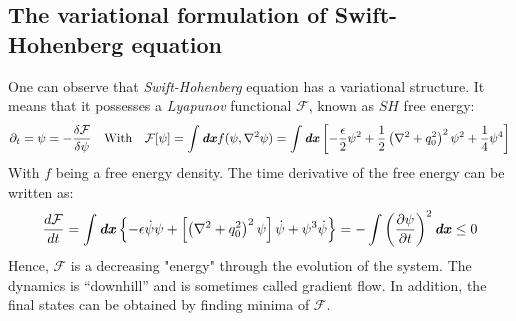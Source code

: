 \documentclass[11pt]{article}
\begin{document}
\subsection{The variational formulation of Swift-Hohenberg equation}
One can observe that \emph{Swift-Hohenberg} equation has a variational structure. It means that it possesses a \emph{Lyapunov} functional $\mathcal{F}$, known as $SH$ free energy:
\begin{equation}
    \partial_t = \psi = - \frac{\delta \mathcal{F}}{ \delta \psi} \quad \text{With} \quad \mathcal{F}[\psi] = \int \bm{\mathit{dx}} f(\psi,\nabla^2\psi) = \int \bm{\mathit{dx}} \left[ - \frac{\epsilon}{2} \psi ^2 + \frac{1}{2}\left( \nabla^2+q_0^2\right)^2 \psi^2  + \frac{1}{4} \psi^4 \right]
\end{equation}
With $f$ being a free energy density. The time derivative of the free energy can be written as:
\begin{equation}
    \frac{d \mathcal{F}}{dt} =\int \bm{\mathit{dx}} \left\lbrace-\epsilon \dot \psi \psi+\left[  \left( \nabla^2+q_0^2\right)^2 \psi \right] \dot \psi + \psi^3 \dot \psi \right\rbrace = - \int \left( \frac{\partial \psi}{\partial t}\right)^2 \bm{\mathit{dx}} \leq 0
\end{equation}
Hence, $\mathcal{F}$ is a decreasing "energy" through the evolution of the system.  The dynamics is “downhill” and is sometimes called gradient flow. In addition, the final states can be obtained by finding minima of $\mathcal{F}$.
\end{document}
